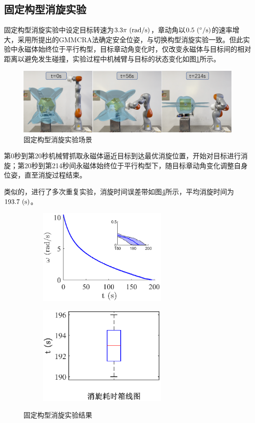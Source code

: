 \documentclass[lang=chs, degree=master, blindreview=false, winfonts=true]{yanputhesis}
\begin{document}
\subsection{固定构型消旋实验}
固定构型消旋实验中设定目标转速为$3.3\pi\ \rm{(rad/s)}$，章动角以$0.5\ \rm{(^\circ/s)}$的速率增大，采用所提出的GMMCRA法确定安全位姿，与切换构型消旋实验一致。但此实验中永磁体始终位于平行构型，目标章动角变化时，仅改变永磁体与目标间的相对距离以避免发生碰撞，实验过程中机械臂与目标的状态变化如图\ref{fig:posefix_exp}所示。
\begin{figure}[htbp]
	\centering
	\includegraphics[width = 5.4in]{picture/posefix_exp.png}
	\caption{固定构型消旋实验场景}
	\label{fig:posefix_exp}
\end{figure}

第0秒到第20秒机械臂抓取永磁体逼近目标到达最优消旋位置，开始对目标进行消旋；第20秒到第214秒间永磁体始终位于平行构型下，随目标章动角变化调整自身位姿，直至消旋过程结束。

类似的，进行了多次重复实验，消旋时间误差带如图\ref{Fig.posefix_result}所示，平均消旋时间为$193.7\ \rm{(s)}$。
\begin{figure}[htbp]
	\centering
	\begin{minipage}[t]{0.96\textwidth}
		\begin{subfigure}[t]{0.47\textwidth}
			\centering
			\includegraphics[width = 2.5in]{picture/posefix_errbar.eps}
			\caption{ }
			\label{fig:posefix_errbar}
		\end{subfigure}\hfill
		\begin{subfigure}[t]{0.47\textwidth}
			\centering
			\includegraphics[width = 2.5in]{picture/posefix_boxline.eps}
			\caption{ }
			\label{fig:posefix_boxline}
		\end{subfigure}
	\end{minipage}
	\caption{固定构型消旋实验结果\label{Fig.posefix_result}}
\end{figure}
\end{document}
